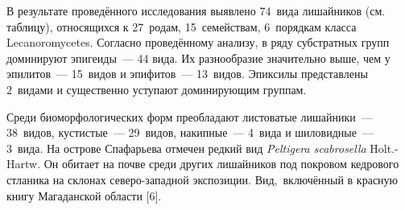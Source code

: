 В результате проведённого исследования выявлено 74~вида лишайников (см. таблицу), относящихся к 27~родам, 15~семействам, 6~порядкам класса Lecanoromycetes. Согласно проведённому анализу, в ряду субстратных групп доминируют эпигеиды~--- 44 вида. Их разнообразие значительно выше, чем у эпилитов~--- 15~видов и эпифитов~--- 13~видов. Эпиксилы представлены 2~видами и существенно уступают доминирующим группам.

Среди биоморфологических форм преобладают листоватые лишайники~--- 38~видов, кустистые~--- 29~видов, накипные~--- 4~вида и шиловидные~--- 3~вида. На острове Спафарьева отмечен редкий вид \textit{Peltigera scabrosella} Holt.-Hartw. Он обитает на почве среди других лишайников под покровом кедрового стланика на склонах северо-западной экспозиции. Вид,~включённый в красную книгу Магаданской области [6].

